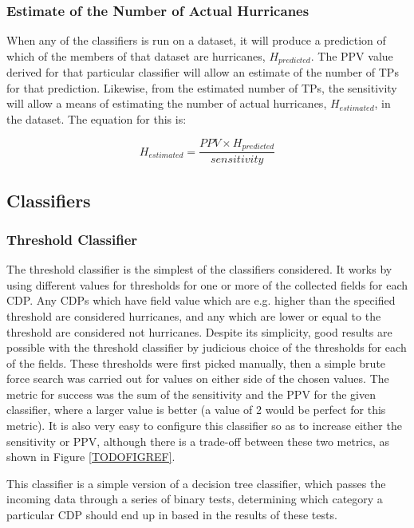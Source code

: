 \documentclass[pdftex,12pt,a4paper]{report}
\begin{document}
\subsubsection{Estimate of the Number of Actual Hurricanes}

When any of the classifiers is run on a dataset, it will produce a prediction of which of the
members of that dataset are hurricanes, $H_{predicted}$. The PPV value derived for that particular classifier will
allow an estimate of the number of TPs for that prediction. Likewise, from the estimated number of
TPs, the sensitivity will allow a means of estimating the number of actual hurricanes, $H_{estimated}$,
in the dataset. The equation for this is:

\begin{equation}
    H_{estimated} = \frac{PPV \times H_{predicted}}{sensitivity}
    \label{eqn:n_actual_hurricane}
\end{equation}

\subsection{Classifiers}

\subsubsection{Threshold Classifier}
The threshold classifier is the simplest of the classifiers considered. It works by using different
values for thresholds for one or more of the collected fields for each CDP. Any CDPs which have
field value which are e.g. higher than the specified threshold are considered hurricanes, and any
which are lower or equal to the threshold are considered not hurricanes. Despite its simplicity,
good results are possible with the threshold classifier by judicious choice of the thresholds for
each of the fields. These thresholds were first picked manually, then a simple brute force search
was carried out for values on either side of the chosen values. The metric for success was the sum
of the sensitivity and the PPV for the given classifier, where a larger value is better (a value of
2 would be perfect for this metric). It is also very easy to configure this classifier so as to
increase either the sensitivity or PPV, although there is a trade-off between these two metrics, as
shown in Figure \ref{TODOFIGREF}.

This classifier is a simple version of a decision tree classifier, which passes the incoming data
through a series of binary tests, determining which category a particular CDP should end up in based
in the results of these tests.
\end{document}

